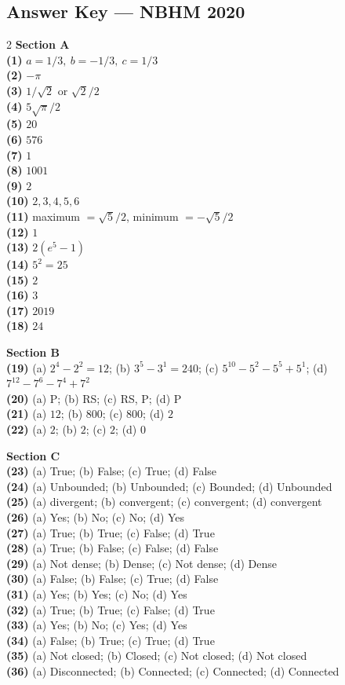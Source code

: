 \documentclass[11pt,a4paper]{article}
\newcommand{\examsec}[1]{%
  \subsection*{#1}
  \vspace{-2pt}
}
\begin{document}
\examsec{Answer Key --- NBHM 2020}
\begin{multicols}{2}
\textbf{Section A}\\
\textbf{(1)} $a = 1/3,\ b = -1/3,\ c = 1/3$\\
\textbf{(2)} $-\pi$\\
\textbf{(3)} $1/\sqrt{2}$ or $\sqrt{2}/2$\\
\textbf{(4)} $5\sqrt{\pi}/2$\\
\textbf{(5)} $20$\\
\textbf{(6)} $576$\\
\textbf{(7)} $1$\\
\textbf{(8)} $1001$\\
\textbf{(9)} $2$\\
\textbf{(10)} $2, 3, 4, 5, 6$\\
\textbf{(11)} maximum $= \sqrt{5}/2$, minimum $= -\sqrt{5}/2$\\
\textbf{(12)} $1$\\
\textbf{(13)} $2(e^5 - 1)$\\
\textbf{(14)} $5^2 = 25$\\
\textbf{(15)} $2$\\
\textbf{(16)} $3$\\
\textbf{(17)} $2019$\\
\textbf{(18)} $24$

\medskip
\textbf{Section B}\\
\textbf{(19)} (a) $2^4 - 2^2 = 12$; (b) $3^5 - 3^1 = 240$; (c) $5^{10} - 5^2 - 5^5 + 5^1$; (d) $7^{12} - 7^6 - 7^4 + 7^2$\\
\textbf{(20)} (a) P; (b) RS; (c) RS, P; (d) P\\
\textbf{(21)} (a) $12$; (b) $800$; (c) $800$; (d) $2$\\
\textbf{(22)} (a) $2$; (b) $2$; (c) $2$; (d) $0$

\medskip
\textbf{Section C}\\
\textbf{(23)} (a) True; (b) False; (c) True; (d) False\\
\textbf{(24)} (a) Unbounded; (b) Unbounded; (c) Bounded; (d) Unbounded\\
\textbf{(25)} (a) divergent; (b) convergent; (c) convergent; (d) convergent\\
\textbf{(26)} (a) Yes; (b) No; (c) No; (d) Yes\\
\textbf{(27)} (a) True; (b) True; (c) False; (d) True\\
\textbf{(28)} (a) True; (b) False; (c) False; (d) False\\
\textbf{(29)} (a) Not dense; (b) Dense; (c) Not dense; (d) Dense\\
\textbf{(30)} (a) False; (b) False; (c) True; (d) False\\
\textbf{(31)} (a) Yes; (b) Yes; (c) No; (d) Yes\\
\textbf{(32)} (a) True; (b) True; (c) False; (d) True\\
\textbf{(33)} (a) Yes; (b) No; (c) Yes; (d) Yes\\
\textbf{(34)} (a) False; (b) True; (c) True; (d) True\\
\textbf{(35)} (a) Not closed; (b) Closed; (c) Not closed; (d) Not closed\\
\textbf{(36)} (a) Disconnected; (b) Connected; (c) Connected; (d) Connected
\end{multicols}
\end{document}
